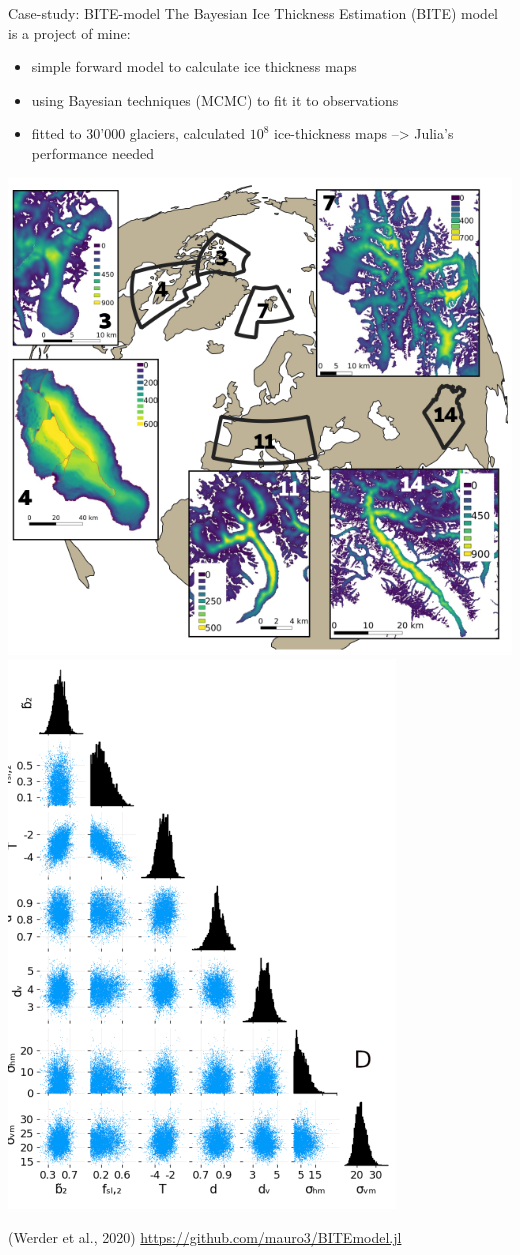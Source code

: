 \documentclass[compress,presentation,aspectratio=169]{beamer}
\begin{document}
\begin{frame}[label={sec:orga2001c6}]{Case-study: BITE-model}
  \footnotesize
The Bayesian Ice Thickness Estimation (BITE) model is a project of mine:
\begin{itemize}
\item simple forward model to calculate ice thickness maps
\item using Bayesian techniques (MCMC) to fit it to observations
\item fitted to 30'000 glaciers, calculated $10^8$ ice-thickness maps
--> Julia's performance needed
\end{itemize}

\begin{center}
\includegraphics[width=.4\linewidth]{./figs/bite.png}
\includegraphics[width=.25\linewidth]{./figs/bite-2.png}
\end{center}
(Werder et al., 2020) \url{https://github.com/mauro3/BITEmodel.jl}
\end{frame}
\end{document}
